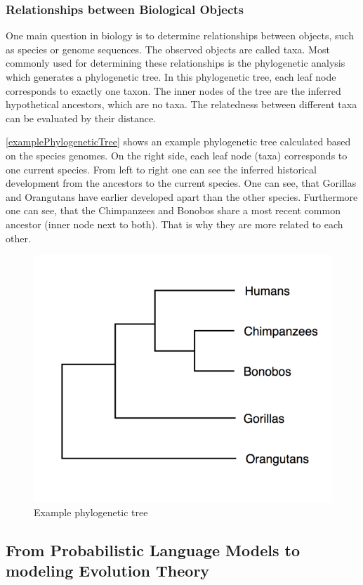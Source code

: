 \subsubsection{Relationships between Biological Objects} \label{fundamentalsAd}

One main question in biology is to determine relationships between objects, such as species or genome sequences. The observed objects are called taxa. Most commonly used for determining these relationships is the phy\-lo\-ge\-ne\-tic analysis which generates a phy\-lo\-ge\-ne\-tic tree. In this phy\-lo\-ge\-ne\-tic tree, each leaf node corresponds to exactly one taxon. The inner nodes of the tree are the inferred hypothetical ancestors, which are no taxa. The relatedness between different taxa can be evaluated by their distance. \cite{böckenhauer2013algorithmische}

\autoref{examplePhylogeneticTree} shows an example phylogenetic tree calculated based on the species genomes. On the right side, each leaf node (taxa) corresponds to one current species. From left to right one can see the inferred historical development from the ancestors to the current species. One can see, that Gorillas and Orangutans have earlier developed apart than the other species. Furthermore one can see, that the  Chimpanzees and Bonobos share a most recent common ancestor (inner node next to both). That is why they are more related to each other. \cite{mallawaarachchiMolecularPhylogeneticsUsing2018}

\begin{figure}[ht]
	\centering
	\includegraphics[width=0.5\linewidth]{figures/examplePhylogeneticTree.png}
	\caption{Example phylogenetic tree \cite{mallawaarachchiMolecularPhylogeneticsUsing2018}}
	\label{examplePhylogeneticTree}
\end{figure}

\newpage

\subsection{From Probabilistic Language Models to modeling Evolution Theory} \label{fundamentalsB}

